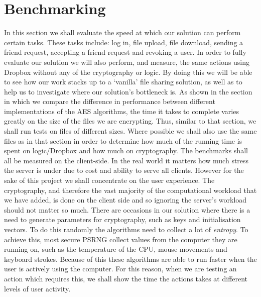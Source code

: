 \documentclass[12pt, titlepage]{article}
\begin{document}
\section{Benchmarking}
In this section we shall evaluate the speed at which our solution can perform certain tasks. These tasks include: log in, file upload, file download, sending a friend request, accepting a friend request and revoking a user. In order to fully evaluate our solution we will also perform, and measure, the same actions using Dropbox without any of the cryptography or logic. By doing this we will be able to see how our work stacks up to a `vanilla' file sharing solution, as well as to help us to investigate where our solution's bottleneck is.
\newline \indent As shown in the section in which we compare the difference in performance between different implementations of the AES algorithms, the time it takes to complete varies greatly on the size of the files we are encrypting. Thus, similar to that section, we shall run tests on files of different sizes. Where possible we shall also use the same files as in that section in order to determine how much of the running time is spent on logic/Dropbox and how much on cryptography.
\newline \indent The benchmarks shall all be measured on the client-side. In the real world it matters how much stress the server is under due to cost and ability to serve all clients. However for the sake of this project we shall concentrate on the user experience. The cryptography, and therefore the vast majority of the computational workload that we have added, is done on the client side and so ignoring the server's workload should not matter so much.
\newline \indent There are occasions in our solution where there is a need to generate parameters for cryptography, such as keys and initialisation vectors. To do this randomly the algorithms need to collect a lot of \textit{entropy}. To achieve this, most secure PSRNG collect values from the computer they are running on, such as the temperature of the CPU, mouse movements and keyboard strokes. Because of this these algorithms are able to run faster when the user is actively using the computer. For this reason, when we are testing an action which requires this, we shall show the time the actions takes at different levels of user activity.
\end{document}
